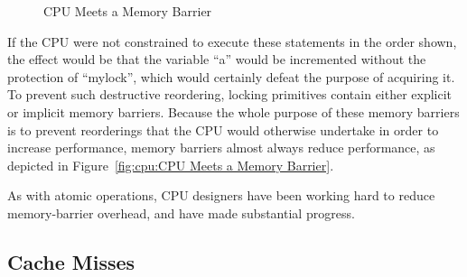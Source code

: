 \begin{figure}[tb]
\begin{center}
\end{center}
\caption{CPU Meets a Memory Barrier}
\end{figure}

If the CPU were not constrained to execute these statements in the
order shown, the effect would be that the variable ``a'' would be
incremented without the protection of ``mylock'', which would certainly
defeat the purpose of acquiring it.
To prevent such destructive reordering, locking primitives contain
either explicit or implicit memory barriers.
Because the whole purpose of these memory barriers is to prevent reorderings
that the CPU would otherwise undertake in order to increase performance,
memory barriers almost always reduce performance, as depicted in
Figure~\ref{fig:cpu:CPU Meets a Memory Barrier}.

As with atomic operations, CPU designers have been working hard to
reduce memory-barrier overhead, and have made substantial progress.

\subsection{Cache Misses}
\label{sec:cpu:Cache Misses}

